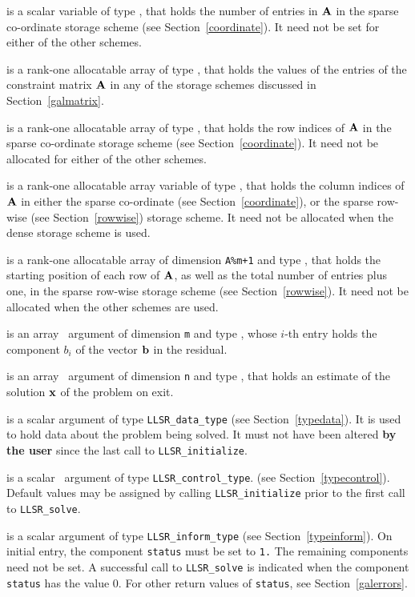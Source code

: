 \documentclass{galahad}
\newcommand{\packagename}{LLSR}
\begin{document}
\begin{description}
\begin{description}
 is a scalar variable of type \integer, that
holds the number of entries in ${\mathbf{A}}$
in the sparse co-ordinate storage scheme (see Section~\ref{coordinate}).
It need not be set for either of the other schemes.

 is a rank-one allocatable array of type \realdp, that holds
the values of the entries of the constraint matrix ${\mathbf{A}}$ in any of the
storage schemes discussed in Section~\ref{galmatrix}.

 is a rank-one allocatable array of type \integer,
that holds the row indices of ${\mathbf{A}}$ in the sparse co-ordinate storage
scheme (see Section~\ref{coordinate}).
It need not be allocated for either of the other schemes.

 is a rank-one allocatable array variable of type \integer,
that holds the column indices of ${\mathbf{A}}$ in either the sparse co-ordinate
(see Section~\ref{coordinate}), or the sparse row-wise
(see Section~\ref{rowwise}) storage scheme.
It need not be allocated when the dense storage scheme is used.

 is a rank-one allocatable array of dimension {\tt A\%m+1} and type
\integer, that holds the starting position of
each row of ${\mathbf{A}}$, as well
as the total number of entries plus one, in the sparse row-wise storage
scheme (see Section~\ref{rowwise}). It need not be allocated when the
other schemes are used.
\end{description}

 is an array \intentin\ argument of dimension {\tt m} and
type \realdp,  whose $i$-th entry holds the component $b_i$ of
the vector ${\mathbf{b}}$ in the residual.

 is an array \intentout\ argument of dimension {\tt n} and
type \realdp, that holds an estimate of the solution ${\mathbf{x}}$
of the problem on exit.

 is a scalar \intentinout argument of type
{\tt \packagename\_data\_type}
(see Section~\ref{typedata}). It is used to hold data about the problem being
solved. It must not have been altered {\bf by the user} since the last call to
{\tt \packagename\_initialize}.

 is a scalar \intentin\ argument of type
{\tt \packagename\_control\_type}.
(see Section~\ref{typecontrol}).
Default values may be assigned by calling {\tt \packagename\_initialize}
prior to the first call to {\tt \packagename\_solve}.

 is a scalar \intentinout argument of type
{\tt \packagename\_inform\_type}
(see Section~\ref{typeinform}).
On initial entry, the component {\tt status} must be set to {\tt 1.}
The remaining components need not be set.
A successful call to
{\tt \packagename\_solve}
is indicated when the  component {\tt status} has the value 0.
For other return values of {\tt status}, see Section~\ref{galerrors}.


\end{description}
\end{document}
